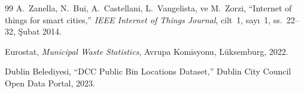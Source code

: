 \documentclass[12pt,a4paper]{report}
\begin{document}
\begin{thebibliography}{99}
A.\ Zanella, N.\ Bui, A.\ Castellani, L.\ Vangelista, ve M.\ Zorzi,
``Internet of things for smart cities,''
\textit{IEEE Internet of Things Journal}, cilt~1, sayı~1, ss.\ 22--32, Şubat 2014.

Eurostat,
\textit{Municipal Waste Statistics},
Avrupa Komisyonu, Lüksemburg, 2022.

Dublin Belediyesi,
``DCC Public Bin Locations Dataset,''
Dublin City Council Open Data Portal, 2023.

\end{thebibliography}
\end{document}
